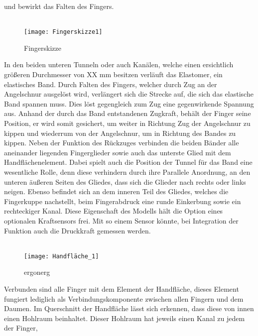 \documentclass[titlepage,12pt,twoside]{article}
\begin{document}
und bewirkt das Falten des Fingers. \\
\\
\begin{figure}[H]
	\begin{center}
		\scalebox{1}
		{\texttt{[image: Fingerskizze1]}}
		\caption{Fingerskizze}
		\label{fig:Fingerskizze1}		
	\end{center}
\end{figure}
\hfill \break
In den beiden unteren Tunneln oder auch Kanälen, 
welche einen ersichtlich größeren Durchmesser von XX mm besitzen verläuft das 
Elastomer, ein elastisches Band. Durch Falten des Fingers, welcher durch Zug an der 
Angelschnur ausgelöst wird, verlängert sich die Strecke auf, die sich das elastische 
Band spannen muss. Dies löst gegengleich zum Zug eine gegenwirkende Spannung aus. 
Anhand der durch das Band entstandenen Zugkraft, behält der Finger seine Position, 
er wird somit gesichert, um weiter in Richtung Zug der Angelschnur zu kippen und 
wiederrum von der Angelschnur, um in Richtung des Bandes zu kippen. Neben der 
Funktion des Rückzuges verbinden die beiden Bänder alle aneinander liegenden 
Fingerglieder sowie auch das unterste Glied mit dem Handflächenelement. Dabei 
spielt auch die Position der Tunnel für das Band eine wesentliche Rolle, denn 
diese verhindern durch ihre Parallele Anordnung, an den unteren äußeren Seiten 
des Gliedes, dass sich die Glieder nach rechts oder links neigen. 
Ebenso befindet sich an dem inneren Teil des Gliedes, welches die Fingerkuppe 
nachstellt, beim Fingerabdruck eine runde Einkerbung sowie ein rechteckiger Kanal. 
Diese Eigenschaft des Modells hält die Option eines optionalen Kraftsensors frei. 
Mit so einem Sensor könnte, bei Integration der Funktion auch die Druckkraft 
gemessen werden. \\
\\
\begin{figure}[H]
	\begin{center}
		\scalebox{1}
		{\texttt{[image: Handfläche\_1]}}
		\caption{ergonerg}
		\label{fig:Handfläche_1}		
	\end{center}
\end{figure}
\hfill \break
Verbunden sind alle Finger mit dem Element der Handfläche, dieses Element fungiert 
lediglich als Verbindungskomponente zwischen allen Fingern und dem Daumen. 
Im Querschnitt der Handfläche lässt sich erkennen, dass diese von innen einen 
Hohlraum beinhaltet. Dieser Hohlraum hat jeweils einen Kanal zu jedem der Finger, 
\end{document}
